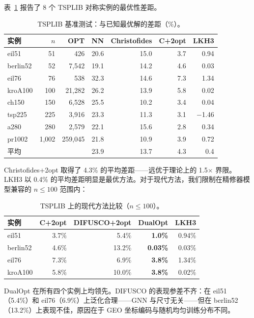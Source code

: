 \documentclass[11pt,a4paper]{ctexart}
\begin{document}
表~\ref{tab:tsplib} 报告了 8 个 TSPLIB 对称实例的最优性差距。

\begin{table}[H]
\centering
\small
\caption{TSPLIB 基准测试：与已知最优解的差距（\%）。}
\label{tab:tsplib}
\begin{tabular}{@{}lrrrrrr@{}}
\toprule
实例 & $n$ & OPT & NN & Christofides & C+2opt & LKH3 \\
\midrule
eil51 & 51 & 426 & 20.6 & 15.0 & 3.7 & 0.94 \\
berlin52 & 52 & 7,542 & 19.1 & 14.2 & 4.6 & 0.03 \\
eil76 & 76 & 538 & 32.3 & 14.6 & 7.3 & 1.34 \\
kroA100 & 100 & 21,282 & 26.2 & 13.9 & 5.8 & 0.02 \\
ch150 & 150 & 6,528 & 25.5 & 10.2 & 3.4 & 0.04 \\
tsp225 & 225 & 3,916 & 23.3 & 11.3 & 3.1 & $-$1.46 \\
a280 & 280 & 2,579 & 22.1 & 15.6 & 2.8 & 0.34 \\
pr1002 & 1,002 & 259,045 & 21.8 & 10.9 & 3.9 & 0.72 \\
\midrule
平均 & & & 23.9 & 13.7 & 4.3 & 0.4 \\
\bottomrule
\end{tabular}
\end{table}

Christofides+2opt 取得了 4.3\% 的平均差距——远优于理论上的 1.5$\times$ 界限。LKH3 以 0.4\% 的平均差距明显是最优方法。对于现代方法，我们限制在精修器模型兼容的 $n \leq 100$ 范围内：

\begin{table}[H]
\centering
\small
\caption{TSPLIB 上的现代方法比较（$n \leq 100$）。}
\begin{tabular}{@{}lrrrr@{}}
\toprule
实例 & C+2opt & DIFUSCO+2opt & DualOpt & LKH3 \\
\midrule
eil51 & 3.7\% & 5.4\% & \textbf{1.0\%} & 0.94\% \\
berlin52 & 4.6\% & 13.2\% & \textbf{0.03\%} & 0.03\% \\
eil76 & 7.3\% & 6.9\% & \textbf{3.8\%} & 1.34\% \\
kroA100 & 5.8\% & 10.0\% & \textbf{3.8\%} & 0.02\% \\
\bottomrule
\end{tabular}
\end{table}

DualOpt 在所有四个实例上均领先。DIFUSCO 的表现参差不齐：在 eil51（5.4\%）和 eil76（6.9\%）上泛化合理——GNN 与尺寸无关——但在 berlin52（13.2\%）上表现不佳，原因在于 GEO 坐标编码与随机均匀训练分布不同。
\end{document}
